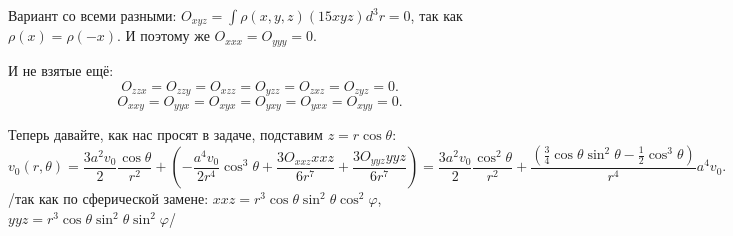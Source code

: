 Вариант со всеми разными: $O_{xyz} = \int \rho(x,y,z) (15 x y z) d^3 r = 0$, так как $\rho(x) = \rho(-x)$. И поэтому же $O_{xxx}=O_{yyy}=0$.

И не взятые ещё:
\begin{equation*}
    O_{z zx} = O_{zzy} = O_{xzz} = O_{yzz} = O_{zxz} = O_{zyz} = 0.
\end{equation*}
\begin{equation*}
    O_{xxy} = O_{yyx} = O_{xyx} = O_{yxy} = O_{yxx} = O_{xyy} = 0.
\end{equation*}

Теперь давайте, как нас просят в задаче, подставим $z = r \cos \theta$:
\begin{equation*}
    v_0(r,\theta) = \frac{3 a^2 v_0}{2} \frac{\cos \theta}{r^2} + \left(
    - \frac{a^4 v_0}{2 r^4} \cos^3 \theta + \frac{3 O_{xxz} xxz}{6 r^7} + \frac{3 O_{yyz}yyz}{6 r^7}
    \right) =
    \frac{3 a^2 v_0}{2} \frac{\cos^2 \theta}{r^2} + \frac{\left(\frac{3}{4} \cos\theta \sin^2 \theta - \frac{1}{2} \cos^3 \theta\right)}{r^4}a^4 v_0.
\end{equation*}
/так как по сферической замене: $xxz = r^3 \cos \theta \sin^2 \theta \cos^2 \varphi$, $yyz = r^3 \cos \theta \sin^2 \theta \sin^2 \varphi$/